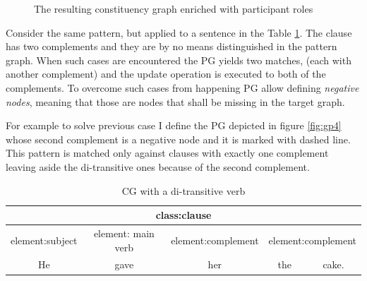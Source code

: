 \begin{figure}[!ht]
    \centering
    \caption{The resulting constituency graph enriched with participant roles}
    \label{fig:cgg-transitive1}
\end{figure}


Consider the same pattern, but applied to a sentence in the Table \ref{tab:di-transitive1}. 
The clause has two complements and they are by no means distinguished in the pattern graph. When such cases are encountered the PG yields two matches, (each with another complement) and the update operation is executed to both of the complements. To overcome such cases from happening PG allow defining \textit{negative nodes}, meaning that those are nodes that shall be missing in the target graph.

For example to solve previous case I define the PG depicted in figure \ref{fig:gp4} whose second complement is a negative node and it is marked with dashed line. This pattern is matched only against clauses with exactly one complement leaving aside the di-transitive ones because of the second complement.

\begin{table}[ht]
\centering
\begin{tabular}{|c|c|c|c|c|}
\hline
\multicolumn{5}{|c|}{class:clause}                                                                  \\ \hline
element:subject & element: main verb & element:complement & \multicolumn{2}{c|}{element:complement} \\ \hline
He              & gave               & her                & the               & cake.               \\ \hline
\end{tabular}
\caption{CG with a di-transitive verb}
\label{tab:di-transitive1}
\end{table}

